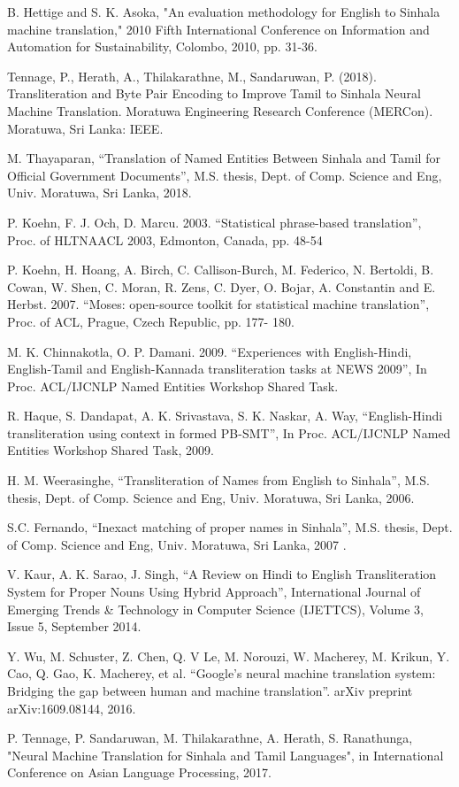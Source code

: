 \documentclass[10pt, a4paper, conference, compsocconf]{IEEEtran}
\begin{document}
\begin{thebibliography}{1}
B. Hettige and S. K. Asoka, "An evaluation methodology for English to Sinhala machine translation," 2010 Fifth International Conference on Information and Automation for Sustainability, Colombo, 2010, pp. 31-36.

Tennage, P., Herath, A., Thilakarathne, M., Sandaruwan, P. (2018). Transliteration and Byte Pair Encoding to Improve Tamil to Sinhala Neural Machine Translation. Moratuwa Engineering Research Conference (MERCon). Moratuwa, Sri Lanka: IEEE.

M. Thayaparan, “Translation of Named Entities Between Sinhala and Tamil for Official Government Documents”, M.S. thesis, Dept. of  Comp. Science and Eng, Univ. Moratuwa, Sri Lanka, 2018.
  
P. Koehn, F. J. Och, D. Marcu. 2003. “Statistical phrase-based translation”, Proc. of HLTNAACL 2003, Edmonton, Canada, pp. 48-54
  
P. Koehn, H. Hoang, A. Birch, C. Callison-Burch, M. Federico, N. Bertoldi, B. Cowan, W. Shen, C. Moran, R. Zens, C. Dyer, O. Bojar, A. Constantin and E. Herbst. 2007. “Moses: open-source toolkit for statistical machine translation”, Proc. of ACL, Prague, Czech Republic, pp. 177- 180.
  
M. K. Chinnakotla, O. P. Damani. 2009. “Experiences with English-Hindi, English-Tamil and English-Kannada transliteration tasks at NEWS 2009”, In Proc. ACL/IJCNLP Named Entities Workshop Shared Task.

R. Haque, S. Dandapat, A. K. Srivastava, S. K. Naskar, A. Way, “English-Hindi transliteration using context in formed PB-SMT”, In Proc. ACL/IJCNLP Named Entities Workshop Shared Task, 2009.

H. M. Weerasinghe, “Transliteration of Names from English to Sinhala”, M.S. thesis, Dept. of  Comp. Science and Eng, Univ. Moratuwa, Sri Lanka, 2006.
  
S.C. Fernando, “Inexact matching of proper names in Sinhala”, M.S. thesis, Dept. of  Comp. Science and Eng, Univ. Moratuwa, Sri Lanka, 2007 .

V. Kaur, A. K. Sarao, J. Singh, “A Review on Hindi to English Transliteration System for Proper Nouns Using Hybrid Approach”, International Journal of Emerging Trends \& Technology in Computer Science (IJETTCS), Volume 3, Issue 5, September 2014.
  
Y. Wu, M. Schuster, Z. Chen, Q. V Le, M. Norouzi, W. Macherey, M. Krikun, Y. Cao, Q. Gao, K. Macherey, et al. “Google’s neural machine translation system: Bridging the gap between human and machine translation”. arXiv preprint arXiv:1609.08144, 2016.

P. Tennage, P. Sandaruwan, M. Thilakarathne, A. Herath, S. Ranathunga, "Neural Machine Translation for Sinhala and Tamil Languages", in International Conference on Asian Language Processing, 2017.

\end{thebibliography}
\end{document}
